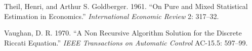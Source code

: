 \documentclass[
  letterpaper,
]{book}
\newlength{\cslhangindent}
\newlength{\cslentryspacingunit} %
\newenvironment{CSLReferences}[2] %
 {%
  \setlength{\parindent}{0pt}
  \ifodd #1
  \let\oldpar\par
  \def\par{\hangindent=\cslhangindent\oldpar}
  \fi
  \setlength{\parskip}{#2\cslentryspacingunit}
 }%
 {}
\begin{document}
\begin{CSLReferences}{1}{0}
\leavevmode{}%
Theil, Henri, and Arthur S. Goldberger. 1961. {``On Pure and Mixed
Statistical Estimation in Economics.''} \emph{International Economic
Review} 2: 317--32.

\leavevmode{}%
Vaughan, D. R. 1970. {``A Non Recursive Algorithm Solution for the
Discrete Riccati Equation.''} \emph{IEEE Transactions on Automatic
Control} AC-15.5: 597--99.

\end{CSLReferences}


\backmatter
\end{document}
